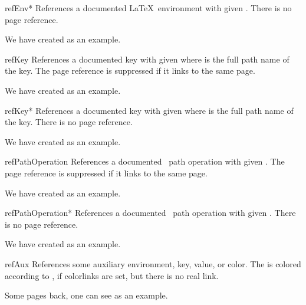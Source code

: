 \begin{docCommand}{refEnv*}{}
  References a documented \LaTeX\ environment with given .
  There is no page reference.
\begin{dispExample}
We have created  as an example.
\end{dispExample}
\end{docCommand}


\begin{docCommand}{refKey}{}
  References a documented key with given  where 
  is the full path name of the key.
  The page reference is suppressed if it links to the same page.
\begin{dispExample}
We have created  as an example.
\end{dispExample}
\end{docCommand}

\begin{docCommand}{refKey*}{}
  References a documented key with given  where 
  is the full path name of the key.
  There is no page reference.
\begin{dispExample}
We have created  as an example.
\end{dispExample}
\end{docCommand}

\clearpage

\begin{docCommand}[doc new=2019-09-17]{refPathOperation}{}
  References a documented \tikzname\ path operation with given .
  The page reference is suppressed if it links to the same page.
\begin{dispExample}
We have created  as an example.
\end{dispExample}
\end{docCommand}

\begin{docCommand}[doc new=2019-09-17]{refPathOperation*}{}
  References a documented \tikzname\ path operation with given .
  There is no page reference.
\begin{dispExample}
We have created  as an example.
\end{dispExample}
\end{docCommand}



\begin{docCommand}[doc updated=2020-02-11]{refAux}{}
  References some auxiliary environment, key, value, or color.
  The  is colored according to ,
  if  colorlinks are set, but there is no real link.
\begin{dispExample}
Some pages back, one can see  as an example.
\end{dispExample}
\end{docCommand}

